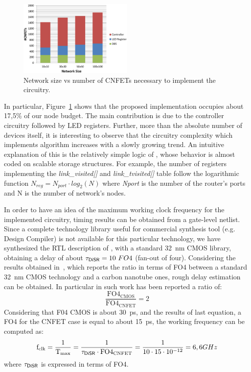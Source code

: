 \begin{figure}
  \centering
  \includegraphics[width=0.50\textwidth]{pictures/synthesis.eps}
  \caption{Network size vs number of CNFETs necessary to implement
  the \disr{} circuitry.}
 \label{fig:synthesys}
\end{figure}

In particular, Figure~\ref{fig:synthesys} shows that the proposed 
implementation occupies about 17,5\% of our node budget. 
The main contribution is due to the controller circuitry followed by LED registers. 
Further, more than the
absolute number of devices itself, it is interesting to observe that
the circuitry complexity which implements \disr{} algorithm increases
with a slowly growing trend. An intuitive explanation of this is the
relatively simple logic of \disr{}, whose behavior is almost coded on
scalable storage structures. For example, the number of registers
implementing the \emph{link\_visited[]} and \emph{link\_tvisited[]}
table follow the logarithmic function $N_{reg}=N_{port} \cdot
log_2(N)$ where \emph{Nport} is the number of the router’s ports and N is
the number of network’s nodes.

In order to have an idea of the maximum working clock frequency for
the implemented circuitry, timing results can be obtained from a 
gate-level netlist. Since a complete technology library useful for
commercial synthesis tool (e.g. Design Compiler) is not available for
this particular technology, we have
synthesized the RTL description of \disr{}, with a standard 32~nm CMOS
library, obtaining a delay of about $\mathrm{\tau_{{\sf DiSR}{}}=10} \ FO4$
(fan-out of four). Considering the results obtained
in~\cite{deng_isscc07}, which reports the ratio in terms of FO4
between a standard 32~nm CMOS technology and a carbon nanotube ones, 
rough delay estimation can be obtained. In particular in such work 
has been reported a ratio of:  
\begin{equation}
\mathrm{\frac{FO4_{CMOS}}{FO4_{CNFET}}=2}  
\end{equation}
Considering that F04 CMOS is about 30~ps, and the results of last
equation, a FO4 for the CNFET case is equal to about 15~ps, the working 
frequency can be computed as:
\begin{equation}
\mathrm{f_{clk}=\frac{1}{T_{max}}=\frac{1}{\tau_{{\sf DiSR}{}} \cdot FO4_{CNFET}}}=
\frac{1}{10\cdot 15 \cdot 10^{-12}}=6,6 GHz
\end{equation}
where $\mathrm{\tau_{{\sf DiSR}{}}}$ is expressed in terms of FO4.


